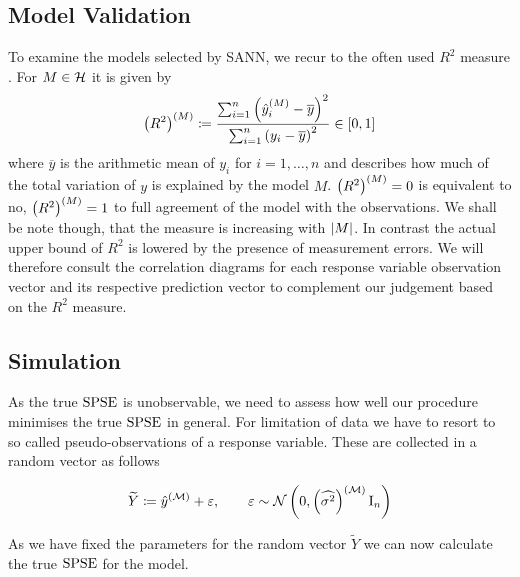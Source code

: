 		\medskip
		\begin{tcolorbox}[colframe=black,colbacktitle=white,coltitle=black, attach boxed title to top center={yshift=-2mm},enhanced, titlerule=0.1pt, boxrule=0.5pt, arc=5pt,title=Listing:\quad SANN algorithm]
			
		\end{tcolorbox}
		\medskip

		
	\subsection{Model Validation}
	\label{ssec:model-validation}
	
		To examine the models selected by SANN, we recur to the often used $R^2$ measure \cite[33-4]{draper:98a}.
		For $M\in\mathcal{H}$ it is given by
		\[
			\left( R^2 \right)^{(M)} \coloneqq \frac {\sum_{i=1}^n \left( \hat{y}^{(M)}_i - \overline{y} \right)^2}{\sum_{i=1}^n \left( y_i - \overline{y} \right)^2} \in [0,1]
		\]
		where $\overline{y}$ is the arithmetic mean of $y_i$ for $i=1,\ldots,n$ and describes how much of the total variation of $y$ is explained by the model $M$.
		$\left( R^2 \right)^{(M)} = 0$ is equivalent to no, $\left( R^2 \right)^{(M)} = 1$ to full agreement of the model with the observations.
		We shall be note though, that the measure is increasing with $\left\vert M \right\vert$.
		In contrast the actual upper bound of $R^2$ is lowered by the presence of measurement errors.
		We will therefore consult the correlation diagrams for each response variable observation vector and its respective prediction vector to complement our judgement based on the $R^2$ measure.

	
	\subsection{Simulation}
	\label{ssec:simulation}
	
		As the true $\mathrm{SPSE}$ is unobservable, we need to assess how well our procedure minimises the true $\mathrm{SPSE}$ in general.
		For limitation of data we have to resort to so called pseudo-observations of a response variable.
		These are collected in a random vector as follows
		
		\[
			\widetilde{Y} \coloneqq \hat{y}^{(\mathcal{M})} + \varepsilon,\qquad \varepsilon \sim  \mathcal{N} \left( 0,\left( \widehat{\sigma^2} \right)^{(\mathcal{M})}\mathrm{I}_n \right)
		\]

		As we have fixed the parameters for the random vector $\widetilde{Y}$ we can now calculate the true $\mathrm{SPSE}$ for the model.

